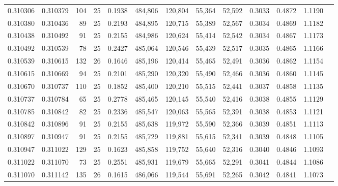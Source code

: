 \begin{tabular}{rrrrrrrrrrrrr}
0.310306 & 0.310379 &   104 &  25 &                                     0.1938 & 484,806 & 120,804 &  55,364 &  52,592 & 0.3033 & 0.4872 & 1.1190 \\
0.310380 & 0.310436 &    89 &  25 &                                     0.2193 & 484,895 & 120,715 &  55,389 &  52,567 & 0.3034 & 0.4869 & 1.1182 \\
0.310438 & 0.310492 &    91 &  25 &                                     0.2155 & 484,986 & 120,624 &  55,414 &  52,542 & 0.3034 & 0.4867 & 1.1173 \\
0.310492 & 0.310539 &    78 &  25 &                                     0.2427 & 485,064 & 120,546 &  55,439 &  52,517 & 0.3035 & 0.4865 & 1.1166 \\
0.310539 & 0.310615 &   132 &  26 &                                     0.1646 & 485,196 & 120,414 &  55,465 &  52,491 & 0.3036 & 0.4862 & 1.1154 \\
0.310615 & 0.310669 &    94 &  25 &                                     0.2101 & 485,290 & 120,320 &  55,490 &  52,466 & 0.3036 & 0.4860 & 1.1145 \\
0.310670 & 0.310737 &   110 &  25 &                                     0.1852 & 485,400 & 120,210 &  55,515 &  52,441 & 0.3037 & 0.4858 & 1.1135 \\
0.310737 & 0.310784 &    65 &  25 &                                     0.2778 & 485,465 & 120,145 &  55,540 &  52,416 & 0.3038 & 0.4855 & 1.1129 \\
0.310785 & 0.310842 &    82 &  25 &                                     0.2336 & 485,547 & 120,063 &  55,565 &  52,391 & 0.3038 & 0.4853 & 1.1121 \\
0.310842 & 0.310896 &    91 &  25 &                                     0.2155 & 485,638 & 119,972 &  55,590 &  52,366 & 0.3039 & 0.4851 & 1.1113 \\
0.310897 & 0.310947 &    91 &  25 &                                     0.2155 & 485,729 & 119,881 &  55,615 &  52,341 & 0.3039 & 0.4848 & 1.1105 \\
0.310947 & 0.311022 &   129 &  25 &                                     0.1623 & 485,858 & 119,752 &  55,640 &  52,316 & 0.3040 & 0.4846 & 1.1093 \\
0.311022 & 0.311070 &    73 &  25 &                                     0.2551 & 485,931 & 119,679 &  55,665 &  52,291 & 0.3041 & 0.4844 & 1.1086 \\
0.311070 & 0.311142 &   135 &  26 &                                     0.1615 & 486,066 & 119,544 &  55,691 &  52,265 & 0.3042 & 0.4841 & 1.1073 \\

\end{tabular}
